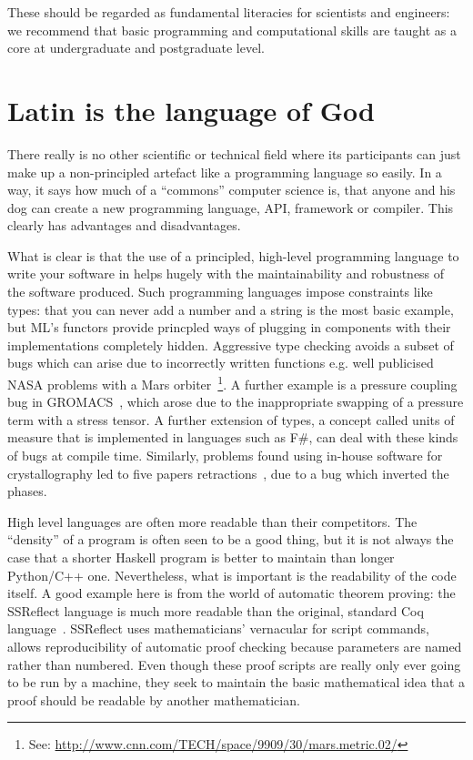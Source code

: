 \documentclass[conference]{IEEEtran}
\begin{document}
These should be regarded as fundamental literacies for scientists and
engineers: we recommend that basic programming and computational
skills are taught as a core at undergraduate and postgraduate level.


\section{Latin is the language of God} 

There really is no other scientific or technical field where its
participants can just make up a non-principled artefact like a
programming language so easily. In a way, it says how much of a
``commons'' computer science is, that anyone and his dog can create a
new programming language, API, framework or compiler. This clearly has
advantages and disadvantages.

What is clear is that the use of a principled, high-level programming
language to write your software in helps hugely with the
maintainability and robustness of the software produced. Such
programming languages impose constraints like types: that you can
never add a number and a string is the most basic example, but ML's
functors provide princpled ways of plugging in components with their
implementations completely hidden. Aggressive type checking avoids a
subset of bugs which can arise due to incorrectly written functions
e.g. well publicised NASA problems with a Mars orbiter~\footnote{See:
\url{http://www.cnn.com/TECH/space/9909/30/mars.metric.02/}}.  A
further example is a pressure coupling bug in GROMACS~\cite{Hess2008},
which arose due to the inappropriate swapping of a pressure term with
a stress tensor.  A further extension of types, a concept called units
of measure that is implemented in languages such as F\#, can deal with
these kinds of bugs at compile time. Similarly, problems found using
in-house software for crystallography led to five papers
retractions~\cite{Miller2006}, due to a bug which inverted the phases.

High level languages are often more readable than their
competitors. The ``density'' of a program is often seen to be a good
thing, but it is not always the case that a shorter Haskell program is
better to maintain than longer Python/C++ one. Nevertheless, what is
important is the readability of the code itself. A good example here
is from the world of automatic theorem proving: the SSReflect language
is much more readable than the original, standard Coq
language~\cite{GonthierZND13}. SSReflect uses mathematicians'
vernacular for script commands, allows reproducibility of automatic
proof checking because parameters are named rather than numbered. 
Even though these proof scripts are really only ever going to be
run by a machine, they seek to maintain the basic mathematical idea
that a proof should be readable by another mathematician.
\end{document}
